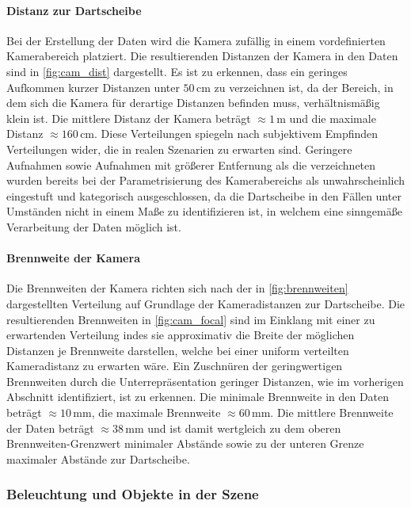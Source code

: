 \paragraph{Distanz zur Dartscheibe}

Bei der Erstellung der Daten wird die Kamera zufällig in einem vordefinierten Kamerabereich platziert. Die resultierenden Distanzen der Kamera in den Daten sind in \autoref{fig:cam_dist} dargestellt. Es ist zu erkennen, dass ein geringes Aufkommen kurzer Distanzen unter $50\,\text{cm}$ zu verzeichnen ist, da der Bereich, in dem sich die Kamera für derartige Distanzen befinden muss, verhältnismäßig klein ist. Die mittlere Distanz der Kamera beträgt $\approx1\,\text{m}$ und die maximale Distanz $\approx160\,\text{cm}$. Diese Verteilungen spiegeln nach subjektivem Empfinden Verteilungen wider, die in realen Szenarien zu erwarten sind. Geringere Aufnahmen sowie Aufnahmen mit größerer Entfernung als die verzeichneten wurden bereits bei der Parametrisierung des Kamerabereichs als unwahrscheinlich eingestuft und kategorisch ausgeschlossen, da die Dartscheibe in den Fällen unter Umständen nicht in einem Maße zu identifizieren ist, in welchem eine sinngemäße Verarbeitung der Daten möglich ist.

\paragraph{Brennweite der Kamera}

Die Brennweiten der Kamera richten sich nach der in \autoref{fig:brennweiten} dargestellten Verteilung auf Grundlage der Kameradistanzen zur Dartscheibe. Die resultierenden Brennweiten in \autoref{fig:cam_focal} sind im Einklang mit einer zu erwartenden Verteilung indes sie approximativ die Breite der möglichen Distanzen je Brennweite darstellen, welche bei einer uniform verteilten Kameradistanz zu erwarten wäre. Ein Zuschnüren der geringwertigen Brennweiten durch die Unterrepräsentation geringer Distanzen, wie im vorherigen Abschnitt identifiziert, ist zu erkennen. Die minimale Brennweite in den Daten beträgt $\approx10\,\text{mm}$, die maximale Brennweite $\approx60\,\text{mm}$. Die mittlere Brennweite der Daten beträgt $\approx38\,\text{mm}$ und ist damit wertgleich zu dem oberen Brennweiten-Grenzwert minimaler Abstände sowie zu der unteren Grenze maximaler Abstände zur Dartscheibe.

\subsubsection{Beleuchtung und Objekte in der Szene}
\label{sec:beleuchtung_ergebnisse}


